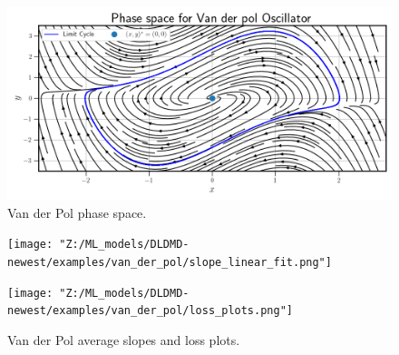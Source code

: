 \begin{figure}[ht]
    \centering
    \begin{minipage}{\textwidth}
        \includegraphics[width=\textwidth]{"Figures/van_der_pol_phase_space.png"} 
    \end{minipage}
    \caption{Van der Pol phase space.}
    \label{fig:van der pol phase space}
\end{figure}

\begin{figure}[ht]
    \centering
    \begin{minipage}{.5\textwidth}
        \texttt{[image: "Z:/ML\_models/DLDMD-newest/examples/van\_der\_pol/slope\_linear\_fit.png"]} 
    \end{minipage}%
    \begin{minipage}{.5\textwidth}
        \texttt{[image: "Z:/ML\_models/DLDMD-newest/examples/van\_der\_pol/loss\_plots.png"]} 
    \end{minipage}
    \caption{Van der Pol average slopes and loss plots.}
\end{figure}

